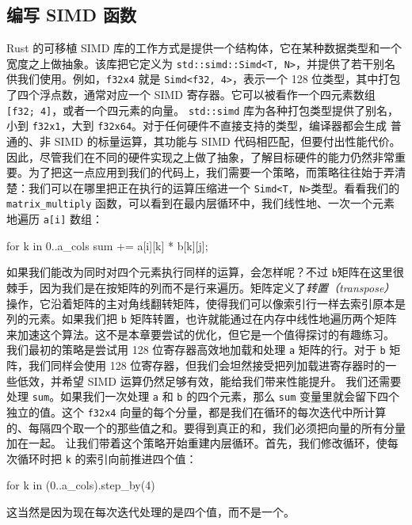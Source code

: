 \subsection{编写 SIMD 函数}
\label{idx:idx_d283d277}
Rust 的可移植 SIMD 库的工作方式是提供一个结构体，它在某种数据类型和一个宽度之上做抽象。该库把它定义为 \texttt{std::\allowbreak{}simd::\allowbreak{}Simd<\allowbreak{}T,\allowbreak{} N>\allowbreak{}}，并提供了若干别名供我们使用。例如，\texttt{f32x4} 就是 \texttt{Simd<\allowbreak{}f32,\allowbreak{} 4>\allowbreak{}}，表示一个 128 位类型，其中打包了四个浮点数，通常对应一个 SIMD 寄存器。它可以被看作一个四元素数组 \texttt{[f32; 4]}，或者一个四元素的向量。
\texttt{std::simd} 库为各种打包类型提供了别名，小到 \texttt{f32x1}，大到
\texttt{f32x64}。对于任何硬件不直接支持的类型，编译器都会生成
普通的、非 SIMD 的标量运算，其功能与 SIMD 代码相匹配，但要付出性能代价。因此，尽管我们在不同的硬件实现之上做了抽象，了解目标硬件的能力仍然非常重要。为了把这一点应用到我们的代码上，我们需要一个策略，而策略往往始于弄清楚：我们可以在哪里把正在执行的运算压缩进一个 \texttt{Simd<T, N>}类型。看看我们的 \texttt{matrix\_\allowbreak{}multiply} 函数，可以看到在最内层循环中，我们线性地、一次一个元素地遍历 \texttt{a[i]} 数组：
\begin{codebox}[text]
for k in 0..a_cols {
    sum += a[i][k] * b[k][j];
}
\end{codebox}
如果我们能改为同时对四个元素执行同样的运算，会怎样呢？不过 \texttt{b}矩阵在这里很棘手，因为我们是在按矩阵的列而不是行来遍历。矩阵定义了\emph{转置（transpose）}操作，它沿着矩阵的主对角线翻转矩阵，使得我们可以像索引行一样去索引原本是列的元素。如果我们把 \texttt{b} 矩阵转置，也许就能通过在内存中线性地遍历两个矩阵来加速这个算法。这不是本章要尝试的优化，但它是一个值得探讨的有趣练习。
我们最初的策略是尝试用 128 位寄存器高效地加载和处理 \texttt{a} 矩阵的行。对于 \texttt{b} 矩阵，我们同样会使用 128 位寄存器，但我们会坦然接受把列加载进寄存器时的一些低效，并希望 SIMD 运算仍然足够有效，能给我们带来性能提升。
我们还需要处理 \texttt{sum}。如果我们一次处理 \texttt{a} 和 \texttt{b} 的四个元素，那么 \texttt{sum} 变量里就会留下四个独立的值。这个 \texttt{f32x4} 向量的每个分量，都是我们在循环的每次迭代中所计算的、每隔四个取一个的那些值之和。要得到真正的和，我们必须把向量的所有分量加在一起。
让我们带着这个策略开始重建内层循环。首先，我们修改循环，使每次循环时把 \texttt{k} 的索引向前推进四个值：
\begin{codebox}[text]
for k in (0..a_cols).step_by(4) {
}
\end{codebox}
\label{idx:idx_03f6e342}
这当然是因为现在每次迭代处理的是四个值，而不是一个。
